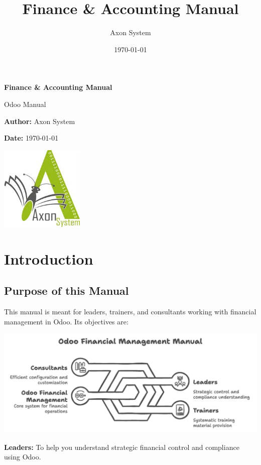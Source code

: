 \documentclass[11pt,a4paper]{article}
\title{Finance \& Accounting Manual}
\author{Axon System}
\date{\today}
\begin{document}
\begin{titlepage}
    \centering
    \vspace*{2cm}
    {\Huge\bfseries Finance \& Accounting Manual\par}
    \vspace{1cm}
    {\Large Odoo Manual\par}
    \vspace{2cm}
    {\Large \textbf{Author:} Axon System\par}
    \vspace{0.5cm}
    {\Large \textbf{Date:} \today\par}
    \vfill
    \includegraphics[width=0.3\textwidth]{logo.png}
    \vfill
\end{titlepage}

\tableofcontents
\newpage

\section{Introduction}
\subsection{Purpose of this Manual}
This manual is meant for leaders, trainers, and consultants working with financial management in Odoo. Its objectives are:

\begin{center}
    \includegraphics[width=0.8\linewidth]{diagram/odoo_financial_management_manual.png}
\end{center}

\noindent\textbf{Leaders:} To help you understand strategic financial control and compliance using Odoo.
\end{document}
